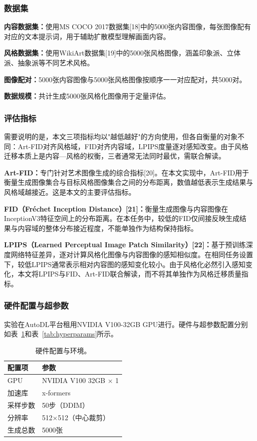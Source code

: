 \documentclass[10pt,twocolumn]{article}
\begin{document}
\subsubsection{数据集}

{\bfseries 内容数据集：}使用MS COCO 2017数据集[18]中的5000张内容图像，每张图像配有对应的文本提示词，用于辅助扩散模型理解画面内容。

{\bfseries 风格数据集：}使用WikiArt数据集[19]中的5000张风格图像，涵盖印象派、立体派、抽象派等不同艺术风格。

{\bfseries 图像配对：}5000张内容图像与5000张风格图像按顺序一一对应配对，共5000对。

{\bfseries 数据规模：}共计生成5000张风格化图像用于定量评估。

\subsubsection{评估指标}

需要说明的是，本文三项指标均以"越低越好"的方向使用，但各自衡量的对象不同：Art-FID对齐风格域，FID对齐内容域，LPIPS度量逐对感知改变。由于风格迁移本质上是内容—风格的权衡，三者通常无法同时最优，需联合解读。

{\bfseries Art-FID：}专门针对艺术图像生成的综合指标[20]。在本文实现中，Art-FID用于衡量生成图像集合与目标风格图像集合之间的分布距离，数值越低表示生成结果与风格域越接近。这是本文的主要评估指标。

{\bfseries FID（Fr\'{e}chet Inception Distance）[21]：}衡量生成图像与内容图像在InceptionV3特征空间上的分布距离。在本任务中，较低的FID仅间接反映生成结果与内容域的整体分布接近程度，不能单独作为结构保持指标。

{\bfseries LPIPS（Learned Perceptual Image Patch Similarity）[22]：}基于预训练深度网络特征差异，逐对计算风格化图像与内容图像的感知相似度。在相同任务设置下，较低LPIPS通常表示相对内容图的感知变化较小。由于风格化必然引入感知变化，本文将LPIPS与FID、Art-FID联合解读，而不将其单独作为风格迁移质量指标。

\subsubsection{硬件配置与超参数}

实验在AutoDL平台租用NVIDIA V100-32GB GPU进行。硬件与超参数配置分别如表~\ref{tab:hardware}和表~\ref{tab:hyperparams}所示。

\begin{table}[htbp]
  \centering
  \caption{硬件配置与环境。}
  \label{tab:hardware}
  \small
  \begin{tabular}{ll}
    \toprule
    配置项 & 参数 \\
    \midrule
    GPU & NVIDIA V100 32GB $\times$ 1 \\
    加速库 & x-formers \\
    采样步数 & 50步（DDIM） \\
    分辨率 & 512$\times$512（中心裁剪） \\
    生成总数 & 5000张 \\
    \bottomrule
  \end{tabular}
\end{table}
\end{document}
